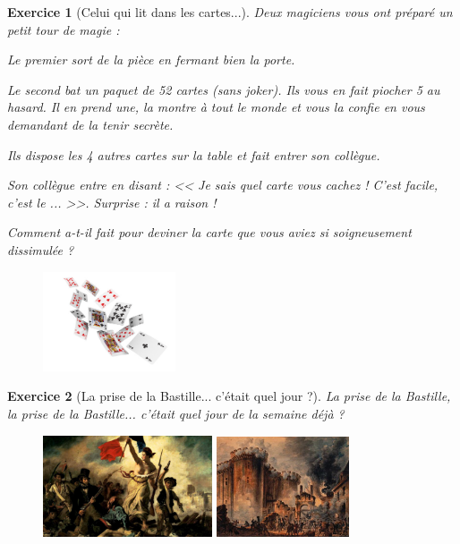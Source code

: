 \documentclass[12pt]{article}
\theoremstyle{break}
\newtheorem{exo}{Exercice}
\begin{document}
\begin{exo}[Celui qui lit dans les cartes...]
Deux magiciens vous ont préparé un petit tour de magie :

Le premier sort de la pièce en fermant bien la porte.

Le second bat un paquet de 52 cartes (sans joker). Ils vous en fait piocher 5 au hasard. Il en prend une, la montre à tout le monde et vous la confie en vous demandant de la tenir secrète.

Ils dispose les 4 autres cartes sur la table et fait entrer son collègue.

Son collègue entre en disant : << Je sais quel carte vous cachez ! C'est facile, c'est le ... >>. Surprise : il a raison !

Comment a-t-il fait pour deviner la carte que vous aviez si soigneusement dissimulée ?

\begin{figure}[h!]
	\centering
	\includegraphics[width=0.35\textwidth]{Cartes.jpeg}
\end{figure}
\end{exo}


\begin{exo}[La prise de la Bastille... c'était quel jour ?]
La prise de la Bastille, la prise de la Bastille... c'était quel jour de la semaine déjà ?

\begin{figure}[h!]
	\centering
	\includegraphics[width=0.445\textwidth]{MarianneGuidantLePeuple.jpg}
    \includegraphics[width=0.35\textwidth]{PriseDeLaBastille.jpg}
\end{figure}
\end{exo}
\end{document}
